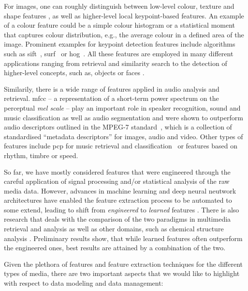 For images, one can roughly distinguish between low-level colour, texture and shape features \cite{Salau:2019Feature}, as well as higher-level local keypoint-based features. An example of a colour feature could be a simple colour histogram or a statistical moment that captures colour distribution, e.g., the average colour in a defined area of the image. Prominent examples for keypoint detection features include algorithms such as \acrfull{sift}~\cite{Lowe:1999object}, \acrfull{surf}~\cite{Bay:2006surf} or \acrfull{hog}~\cite{Dalal:2005Histograms}. All these features are employed in many different applications ranging from retrieval and similarity search to the detection of higher-level concepts, such as, objects or faces \cite{Deniz:2011Face, Farooq:2016Object}.

Similarily, there is a wide range of features applied in audio analysis and retrieval. \acrfull{mfcc} -- a representation of a short-term power spectrum on the perceptual \emph{mel scale} -- play an important role in speaker recognition, sound and music classification as well as audio segmentation \cite{Kim:2010Comparison} and were shown to outperform audio descriptors outlined in the MPEG-7 standard~\cite{Quackenbush:2001Overview}, which is a collection of standardised ``metadata descriptors'' for images, audio and video. Other types of features include \acrfull{pcp} for music retrieval and classification~\cite{Lee:2006Automatic,Demirel:2019Automatic} or features based on rhythm, timbre or speed.

So far, we have mostly considered features that were engineered through the careful application of signal processing and/or statistical analysis of the raw media data. However, advances in machine learning and deep neural neutwork architectures have enabled the feature extraction process to be automated to some extend, leading to shift from  \emph{engineered} to \emph{learned} features \cite{Hamel:2010Learning,Gordo:2016Deep}. There is also research that deals with the comparison of the two paradigms in multimedia retrieval and analysis \cite{Budnik:2017learned} as well as other domains, such as chemical structure analysis \cite{Gallegos:2021importance}. Preliminary results show, that while learned features often outperform the engineered ones, best results are attained by a combination of the two.

Given the plethora of features and feature extraction techniques for the different types of media, there are two important aspects that we would like to highlight with respect to data modeling and data management:

